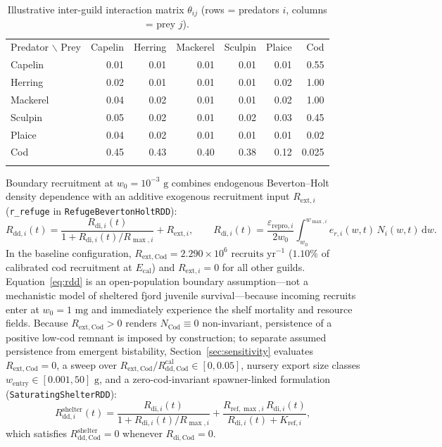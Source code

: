 \documentclass[11pt,letterpaper]{article}
\newcommand{\toprule}{\noalign{\hrule height 0.85pt\vspace{2.5pt}}}
\newcommand{\midrule}{\noalign{\vspace{2pt}\hrule height 0.45pt\vspace{2.5pt}}}
\newcommand{\bottomrule}{\noalign{\vspace{2pt}\hrule height 0.85pt}}
\begin{document}
\begin{table}[t!]
\centering
\caption{Illustrative inter-guild interaction matrix $\theta_{ij}$ (rows = predators $i$, columns = prey $j$).}
\label{tab:inter}
\vspace{0.35em}
{\small
\setlength{\tabcolsep}{7pt}
\begin{tabular}{lrrrrrr}
\toprule
Predator $\backslash$ Prey & Capelin & Herring & Mackerel & Sculpin & Plaice & Cod \\
\midrule
Capelin  & 0.01 & 0.01 & 0.01 & 0.01 & 0.01 & 0.55 \\
Herring  & 0.02 & 0.01 & 0.01 & 0.01 & 0.02 & 1.00 \\
Mackerel & 0.04 & 0.02 & 0.01 & 0.01 & 0.02 & 1.00 \\
Sculpin  & 0.05 & 0.02 & 0.01 & 0.02 & 0.03 & 0.45 \\
Plaice   & 0.04 & 0.02 & 0.01 & 0.01 & 0.01 & 0.02 \\
Cod      & 0.45 & 0.43 & 0.40 & 0.38 & 0.12 & 0.025 \\
\bottomrule
\end{tabular}
}
\end{table}

Boundary recruitment at $w_0 = 10^{-3}\text{ g}$ combines endogenous Beverton--Holt density dependence with an additive exogenous recruitment input $R_{\mathrm{ext},i}$ (\texttt{r\_refuge} in \texttt{RefugeBevertonHoltRDD}):
\begin{equation}
  R_{\mathrm{dd},i}(t) = \frac{R_{\mathrm{di},i}(t)}{1 + R_{\mathrm{di},i}(t) / R_{\max,i}} + R_{\mathrm{ext},i}, \qquad
  R_{\mathrm{di},i}(t) = \frac{\varepsilon_{\mathrm{repro},i}}{2 w_0} \int_{w_0}^{w_{\max,i}} e_{r,i}(w,t)\,N_i(w,t)\,\mathrm{d}w.
  \label{eq:rdd}
\end{equation}
In the baseline configuration, $R_{\mathrm{ext,Cod}} = 2.290 \times 10^6\text{ recruits yr}^{-1}$ ($1.10\%$ of calibrated cod recruitment at $E_{\mathrm{cal}}$) and $R_{\mathrm{ext},i} = 0$ for all other guilds. Equation~\eqref{eq:rdd} is an open-population boundary assumption---not a mechanistic model of sheltered fjord juvenile survival---because incoming recruits enter at $w_0 = 1\text{ mg}$ and immediately experience the shelf mortality and resource fields. Because $R_{\mathrm{ext,Cod}} > 0$ renders $N_{\mathrm{Cod}} \equiv 0$ non-invariant, persistence of a positive low-cod remnant is imposed by construction; to separate assumed persistence from emergent bistability, Section~\ref{sec:sensitivity} evaluates $R_{\mathrm{ext,Cod}} = 0$, a sweep over $R_{\mathrm{ext,Cod}}/R_{\mathrm{dd,Cod}}^{\mathrm{cal}} \in [0, 0.05]$, nursery export size classes $w_{\mathrm{entry}} \in [0.001, 50]\text{ g}$, and a zero-cod-invariant spawner-linked formulation (\texttt{SaturatingShelterRDD}):
\begin{equation}
  R_{\mathrm{dd},i}^{\mathrm{shelter}}(t) = \frac{R_{\mathrm{di},i}(t)}{1 + R_{\mathrm{di},i}(t) / R_{\max,i}} + \frac{R_{\mathrm{ref,\max},i}\,R_{\mathrm{di},i}(t)}{R_{\mathrm{di},i}(t) + K_{\mathrm{ref},i}},
  \label{eq:shelter}
\end{equation}
which satisfies $R_{\mathrm{dd,Cod}}^{\mathrm{shelter}} = 0$ whenever $R_{\mathrm{di,Cod}} = 0$.
\end{document}
